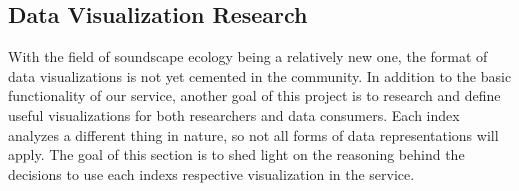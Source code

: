 \subsection{Data Visualization Research}
With the field of soundscape ecology being a relatively new one, the format of data visualizations is not yet cemented in the community. In addition to the basic functionality of our service, another goal of this project is to research and define useful visualizations for both researchers and data consumers. Each index analyzes a different thing in nature, so not all forms of data representations will apply. The goal of this section is to shed light on the reasoning behind the decisions to use each index\textquotesingle s respective visualization in the service.







